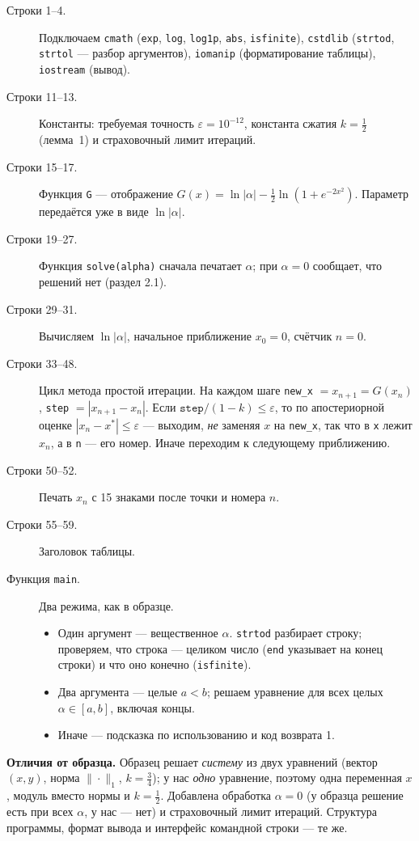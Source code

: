 \documentclass[11pt,a4paper]{article}
\begin{document}
\begin{description}
\item[Строки 1–4.] Подключаем \texttt{cmath} (\texttt{exp}, \texttt{log}, \texttt{log1p}, \texttt{abs}, \texttt{isfinite}), \texttt{cstdlib} (\texttt{strtod}, \texttt{strtol} — разбор аргументов), \texttt{iomanip} (форматирование таблицы), \texttt{iostream} (вывод).
\item[Строки 11–13.] Константы: требуемая точность $\varepsilon=10^{-12}$, константа сжатия $k=\frac12$ (лемма~1) и страховочный лимит итераций.
\item[Строки 15–17.] Функция \texttt{G} — отображение $G(x)=\ln|\alpha|-\frac12\ln(1+e^{-2x^2})$. Параметр передаётся уже в виде $\ln|\alpha|$.
\item[Строки 19–27.] Функция \texttt{solve(alpha)} сначала печатает $\alpha$; при $\alpha=0$ сообщает, что решений нет (раздел 2.1).
\item[Строки 29–31.] Вычисляем $\ln|\alpha|$, начальное приближение $x_0=0$, счётчик $n=0$.
\item[Строки 33–48.] Цикл метода простой итерации. На каждом шаге \texttt{new\_x} $=x_{n+1}=G(x_n)$, \texttt{step} $=|x_{n+1}-x_n|$.
Если $\texttt{step}/(1-k)\le\varepsilon$, то по апостериорной оценке $|x_n-x^*|\le\varepsilon$ — выходим, \emph{не} заменяя $x$ на \texttt{new\_x}, так что в \texttt{x} лежит $x_n$, а в \texttt{n} — его номер. Иначе переходим к следующему приближению.
\item[Строки 50–52.] Печать $x_n$ с 15 знаками после точки и номера $n$.
\item[Строки 55–59.] Заголовок таблицы.
\item[Функция \texttt{main}.] Два режима, как в образце.
\begin{itemize}
\item Один аргумент — вещественное $\alpha$. \texttt{strtod} разбирает строку; проверяем, что строка — целиком число (\texttt{end} указывает на конец строки) и что оно конечно (\texttt{isfinite}).
\item Два аргумента — целые $a<b$; решаем уравнение для всех целых $\alpha\in[a,b]$, включая концы.
\item Иначе — подсказка по использованию и код возврата 1.
\end{itemize}
\end{description}

\textbf{Отличия от образца.} Образец решает \emph{систему} из двух уравнений (вектор $(x,y)$, норма $\|\cdot\|_1$, $k=\frac34$); у нас \emph{одно} уравнение, поэтому одна переменная $x$, модуль вместо нормы и $k=\frac12$. Добавлена обработка $\alpha=0$ (у образца решение есть при всех $\alpha$, у нас — нет) и страховочный лимит итераций. Структура программы, формат вывода и интерфейс командной строки — те же.
\end{document}

